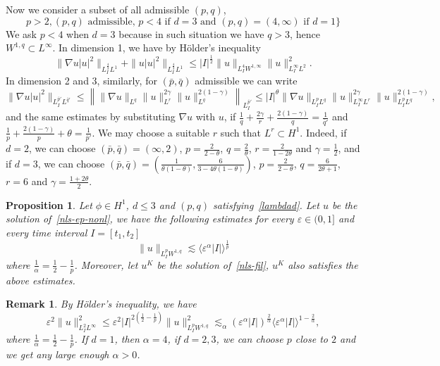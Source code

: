 \documentclass[10pt,a4paper]{article}
\newtheorem{proposition}[theorem]{Proposition}
\newtheorem{remark}[theorem]{Remark}
\begin{document}
  Now we consider a subset of all admissible \((p,q)\),
  \begin{equation}\label{lambdad}
    p>2, (p,q)\text{ admissible, } p<4 \text{ if } d=3 \text{ and }
    (p,q)= (4,\infty) \text{ if } d=1\}
  \end{equation}
  We ask \(p<4\) when \(d=3\) because in such situation we have \(q>3\), hence
  \(W^{1,q} \subset L^\infty\).
  In dimension 1, we have by H\"older's inequality
  \[ \|\nabla u|u|^2\|_{L^\frac43_I L^1} + \|u|u|^2\|_{L^\frac43_I L^1} \leq 
  |I|^\frac12 \|u\|_{L^4_I W^{1,\infty}} \|u\|^2_{L^\infty_I L^2}. \]
  In dimension 2 and 3, similarly, for \((\bar{p},\bar{q})\) admissible we can write
  \begin{equation}\label{XT}
    \|\nabla u |u|^2\|_{L^{\bar{p}'}_I L^{\bar{q}'}} \leq \left\| 
    \|\nabla u\|_{L^q} \|u\|_{L^r}^{2\gamma} \|u\|_{L^q}^{2(1-\gamma)}
    \right\|_{L^{\bar{p}'}_I} \leq |I|^\theta \|\nabla u\|_{L^p_I L^q} 
    \|u\|_{L^\infty_I L^r}^{2\gamma} \|u\|_{L^p_I L^q}^{2(1-\gamma)},
  \end{equation}
  and the same estimates by substituting \(\nabla u\) with \(u\),
  if \( \frac1q + \frac{2\gamma}r + \frac{2(1-\gamma)}q = \frac1{\bar{q}'} \)
  and \( \frac1p + \frac{2(1-\gamma)}p + \theta = \frac1{\bar{p}'} \). We may
  choose a suitable \(r\) such that \(L^r \subset H^1\). Indeed, if \(d=2\),
  we can choose \((\bar{p},\bar{q})=(\infty,2)\), \(p=\frac2{2-\theta}\),
  \(q=\frac2\theta\), \(r=\frac2{1-2\theta}\) and \(\gamma=\frac12\), and if
  \(d=3\), we can choose \((\bar{p},\bar{q})=(\frac1{\theta(1-\theta)},\frac6{3-4\theta(1-\theta)})\), 
  \(p=\frac2{2-\theta}\), \(q=\frac6{2\theta+1}\), \(r=6\) and \(\gamma=\frac{1+2\theta}2\).

  \begin{proposition}
    Let \(\phi \in H^1\), \( d \leq 3 \) and \((p,q)\) satisfying~\eqref{lambdad}. 
    Let \( u \) be the solution of~\eqref{nls-ep-nonl}, we
    have the following estimates for every \( \varepsilon \in (0,1] \) and every
    time interval \( I = [t_1,t_2] \)
    \[ \|u\|_{L^p_I W^{1,q}} \lesssim
    \langle\varepsilon^\alpha |I|\rangle^{\frac1p} \]
    where \( \frac1\alpha = \frac12 - \frac1p \). Moreover, let \( u^K \) be the
    solution of~\eqref{nls-fil}, \(u^K\) also satisfies the above estimates. 
  \end{proposition}

  \begin{remark}
    By H\"older's inequality, we have
    \begin{equation}\label{uL2Linfty}
      \varepsilon^2 \|u\|_{L^2_I L^\infty}^2 \leq \varepsilon^2 |I|^{2(\frac12-\frac1p)}\|u\|_{L^p_I W^{1,q}}^2 
      \lesssim_{\alpha} {(\varepsilon^\alpha |I|)}^\frac2\alpha {\langle\varepsilon^\alpha |I|\rangle}^{1-\frac2\alpha},
    \end{equation}
    where \(\frac1\alpha=\frac12-\frac1p\). If \(d=1\), then \(\alpha=4\),
    if \(d=2,3\), we can choose \(p\) close to \(2\) and we get any large enough
    \(\alpha>0\).
  \end{remark}
  
\end{document}

